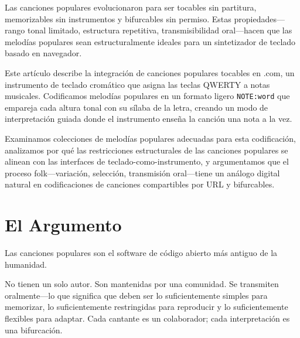 \documentclass[11pt]{article}
\begin{document}
\clearpage
\begin{accentcard}

Las canciones populares evolucionaron para ser tocables sin partitura, memorizables sin instrumentos y bifurcables sin permiso. Estas propiedades---rango tonal limitado, estructura repetitiva, transmisibilidad oral---hacen que las melodías populares sean estructuralmente ideales para un sintetizador de teclado basado en navegador.

\vspace{0.3em}

Este artículo describe la integración de canciones populares tocables en \np{}.com, un instrumento de teclado cromático que asigna las teclas QWERTY a notas musicales. Codificamos melodías populares en un formato ligero \texttt{NOTE:word} que empareja cada altura tonal con su sílaba de la letra, creando un modo de interpretación guiada donde el instrumento enseña la canción una nota a la vez.

\vspace{0.3em}

Examinamos colecciones de melodías populares adecuadas para esta codificación, analizamos por qué las restricciones estructurales de las canciones populares se alinean con las interfaces de teclado-como-instrumento, y argumentamos que el proceso folk---variación, selección, transmisión oral---tiene un análogo digital natural en codificaciones de canciones compartibles por URL y bifurcables.
\end{accentcard}

\section{El Argumento}

Las canciones populares son el software de código abierto más antiguo de la humanidad.

No tienen un solo autor. Son mantenidas por una comunidad. Se transmiten oralmente---lo que significa que deben ser lo suficientemente simples para memorizar, lo suficientemente restringidas para reproducir y lo suficientemente flexibles para adaptar. Cada cantante es un colaborador; cada interpretación es una bifurcación.
\end{document}
